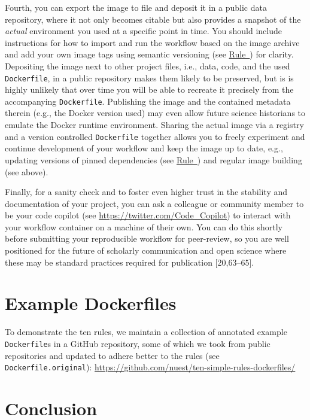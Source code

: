 \documentclass[10pt,letterpaper]{article}
\begin{document}
Fourth, you can export the image to file and deposit it in a public data
repository, where it not only becomes citable but also provides a
snapshot of the \emph{actual} environment you used at a specific point
in time. You should include instructions for how to import and run the
workflow based on the image archive and add your own image tags using
semantic versioning (see
\hyperref[{rule:base}]{Rule~}) for clarity.
Depositing the image next to other project files, i.e., data, code, and
the used \texttt{Dockerfile}, in a public repository makes them likely
to be preserved, but is is highly unlikely that over time you will be
able to recreate it precisely from the accompanying \texttt{Dockerfile}.
Publishing the image and the contained metadata therein (e.g., the
Docker version used) may even allow future science historians to emulate
the Docker runtime environment. Sharing the actual image via a registry
and a version controlled \texttt{Dockerfile} together allows you to
freely experiment and continue development of your workflow and keep the
image up to date, e.g., updating versions of pinned dependencies (see
\hyperref[{rule:pinning}]{Rule~}) and regular
image building (see above).

Finally, for a sanity check and to foster even higher trust in the
stability and documentation of your project, you can ask a colleague or
community member to be your code copilot (see
\url{https://twitter.com/Code_Copilot}) to interact with your workflow
container on a machine of their own. You can do this shortly before
submitting your reproducible workflow for peer-review, so you are well
positioned for the future of scholarly communication and open science
where these may be standard practices required for publication
{[}20,63--65{]}.

\hypertarget{example-dockerfiles}{%
\section{Example Dockerfiles}\label{example-dockerfiles}}

To demonstrate the ten rules, we maintain a collection of annotated
example \texttt{Dockerfile}s in a GitHub repository, some of which we
took from public repositories and updated to adhere better to the rules
(see \texttt{Dockerfile.original}):
\url{https://github.com/nuest/ten-simple-rules-dockerfiles/}

\hypertarget{conclusion}{%
\section*{Conclusion}\label{conclusion}}
\end{document}
